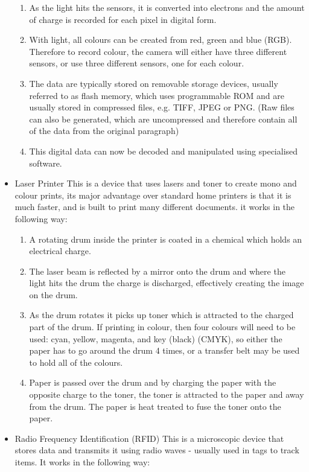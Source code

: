 \begin{itemize}
\begin{enumerate}
        \item As the light hits the sensors, it is converted into electrons and the amount of charge is recorded for each pixel in digital form.
        \item With light, all colours can be created from red, green and blue (RGB). Therefore to record colour, the camera will either have three different sensors, or use three different sensors, one for each colour.
        \item The data are typically stored on removable storage devices, usually referred to as flash memory, which uses programmable ROM and are usually stored in compressed files, e.g. TIFF, JPEG or PNG. (Raw files can also be generated, which are uncompressed and therefore contain all of the data from the original paragraph)
        \item This digital data can now be decoded and manipulated using specialised software.
      \end{enumerate}
    \item Laser Printer
      \subitem This is a device that uses lasers and toner to create mono and colour prints, its major advantage over standard home printers is that it is much faster, and is built to print many different documents. it works in the following way:
      \begin{enumerate}
        \setlength{\itemsep}{0em}
        \item A rotating drum inside the printer is coated in a chemical which holds an electrical charge.
        \item The laser beam is reflected by a mirror onto the drum and where the light hits the drum the charge is discharged, effectively creating the image on the drum.
        \item As the drum rotates it picks up toner which is attracted to the charged part of the drum.
          \subitem If printing in colour, then four colours will need to be used: cyan, yellow, magenta, and key (black) (CMYK), so either the paper has to go around the drum 4 times, or a transfer belt may be used to hold all of the colours.
        \item Paper is passed over the drum and by charging the paper with the opposite charge to the toner, the toner is attracted to the paper and away from the drum. The paper is heat treated to fuse the toner onto the paper.
      \end{enumerate}
    \item Radio Frequency Identification (RFID)
      \subitem This is a microscopic device that stores data and transmits it using radio waves - usually used in tags to track items. It works in the following way:

\end{itemize}
